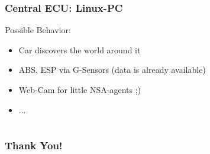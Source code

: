 \documentclass{beamer}
\begin{document}
\begin{frame}
	\frametitle{Central ECU: Linux-PC}
	Possible Behavior:
	\begin{itemize}
		\item Car discovers the world around it
		\item ABS, ESP via G-Sensors (data is already available)
		\item Web-Cam for little NSA-agents ;)
		\item ...
	\end{itemize}
\end{frame}

\section*{}

\begin{frame}
	\frametitle{Thank You!}
	
\end{frame}
\end{document}
